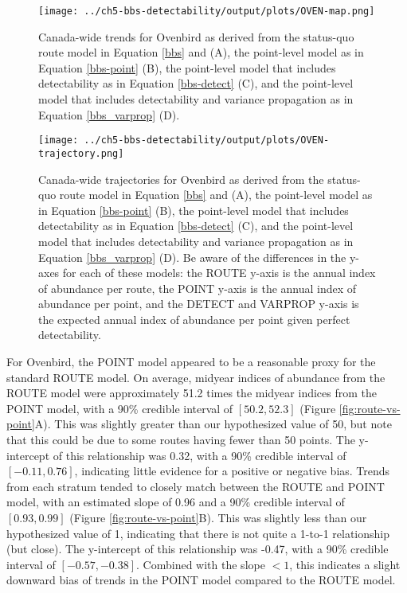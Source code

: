 \begin{figure}[h]
	\texttt{[image: ../ch5-bbs-detectability/output/plots/OVEN-map.png]}
	\caption{Canada-wide trends for Ovenbird as derived from the status-quo route model in Equation \ref{bbs} and \citet{smith_spatially_2023} (A), the point-level model as in Equation \ref{bbs-point} (B), the point-level model that includes detectability as in Equation \ref{bbs-detect} (C), and the point-level model that includes detectability and variance propagation as in Equation \ref{bbs_varprop} (D).}
	\label{fig:oven-map}
\end{figure}

\begin{figure}[h]
	\texttt{[image: ../ch5-bbs-detectability/output/plots/OVEN-trajectory.png]}
	\caption{Canada-wide trajectories for Ovenbird as derived from the status-quo route model in Equation \ref{bbs} and \citet{smith_spatially_2023} (A), the point-level model as in Equation \ref{bbs-point} (B), the point-level model that includes detectability as in Equation \ref{bbs-detect} (C), and the point-level model that includes detectability and variance propagation as in Equation \ref{bbs_varprop} (D). Be aware of the differences in the y-axes for each of these models: the ROUTE y-axis is the annual index of abundance per route, the POINT y-axis is the annual index of abundance per point, and the DETECT and VARPROP y-axis is the expected annual index of abundance per point given perfect detectability.}
	\label{fig:oven-trajectories}
\end{figure}

\par For Ovenbird, the POINT model appeared to be a reasonable proxy for the standard ROUTE model.
On average, midyear indices of abundance from the ROUTE model were approximately 51.2 times the midyear indices from the POINT model, with a 90\% credible interval of $[50.2, 52.3]$ (Figure \ref{fig:route-vs-point}A).
This was slightly greater than our hypothesized value of 50, but note that this could be due to some routes having fewer than 50 points.
The y-intercept of this relationship was 0.32, with a 90\% credible interval of $[-0.11, 0.76]$, indicating little evidence for a positive or negative bias.
Trends from each stratum tended to closely match between the ROUTE and POINT model, with an estimated slope of 0.96 and a 90\% credible interval of $[0.93, 0.99]$ (Figure \ref{fig:route-vs-point}B).
This was slightly less than our hypothesized value of 1, indicating that there is not quite a 1-to-1 relationship (but close).
The y-intercept of this relationship was -0.47, with a 90\% credible interval of $[-0.57, -0.38]$.
Combined with the slope $< 1$, this indicates a slight downward bias of trends in the POINT model compared to the ROUTE model.

